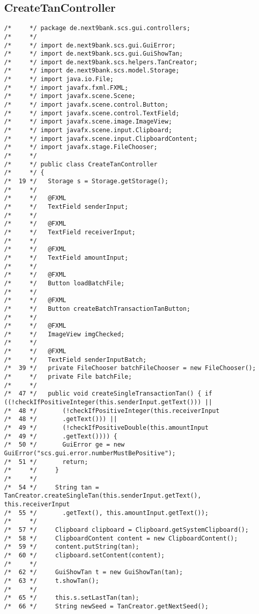 \subsection{CreateTanController}

\begin{lstlisting}
/*     */ package de.next9bank.scs.gui.controllers;
/*     */ 
/*     */ import de.next9bank.scs.gui.GuiError;
/*     */ import de.next9bank.scs.gui.GuiShowTan;
/*     */ import de.next9bank.scs.helpers.TanCreator;
/*     */ import de.next9bank.scs.model.Storage;
/*     */ import java.io.File;
/*     */ import javafx.fxml.FXML;
/*     */ import javafx.scene.Scene;
/*     */ import javafx.scene.control.Button;
/*     */ import javafx.scene.control.TextField;
/*     */ import javafx.scene.image.ImageView;
/*     */ import javafx.scene.input.Clipboard;
/*     */ import javafx.scene.input.ClipboardContent;
/*     */ import javafx.stage.FileChooser;
/*     */ 
/*     */ public class CreateTanController
/*     */ {
/*  19 */   Storage s = Storage.getStorage();
/*     */ 
/*     */   @FXML
/*     */   TextField senderInput;
/*     */ 
/*     */   @FXML
/*     */   TextField receiverInput;
/*     */ 
/*     */   @FXML
/*     */   TextField amountInput;
/*     */ 
/*     */   @FXML
/*     */   Button loadBatchFile;
/*     */ 
/*     */   @FXML
/*     */   Button createBatchTransactionTanButton;
/*     */ 
/*     */   @FXML
/*     */   ImageView imgChecked;
/*     */ 
/*     */   @FXML
/*     */   TextField senderInputBatch;
/*  39 */   private FileChooser batchFileChooser = new FileChooser();
/*     */   private File batchFile;
/*     */ 
/*  47 */   public void createSingleTransactionTan() { if ((!checkIfPositiveInteger(this.senderInput.getText())) || 
/*  48 */       (!checkIfPositiveInteger(this.receiverInput
/*  48 */       .getText())) || 
/*  49 */       (!checkIfPositiveDouble(this.amountInput
/*  49 */       .getText()))) {
/*  50 */       GuiError ge = new GuiError("scs.gui.error.numberMustBePositive");
/*  51 */       return;
/*     */     }
/*     */ 
/*  54 */     String tan = TanCreator.createSingleTan(this.senderInput.getText(), this.receiverInput
/*  55 */       .getText(), this.amountInput.getText());
/*     */ 
/*  57 */     Clipboard clipboard = Clipboard.getSystemClipboard();
/*  58 */     ClipboardContent content = new ClipboardContent();
/*  59 */     content.putString(tan);
/*  60 */     clipboard.setContent(content);
/*     */ 
/*  62 */     GuiShowTan t = new GuiShowTan(tan);
/*  63 */     t.showTan();
/*     */ 
/*  65 */     this.s.setLastTan(tan);
/*  66 */     String newSeed = TanCreator.getNextSeed();

\end{lstlisting}
